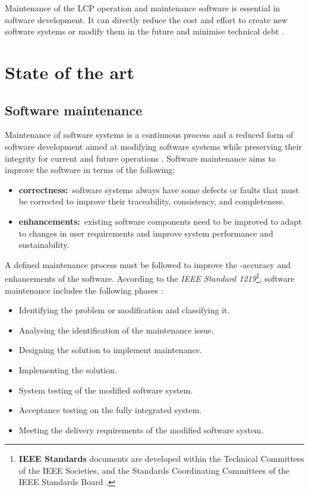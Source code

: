 Maintenance of the LCP operation and maintenance software is essential in software development. It can directly reduce the cost and effort to create new software systems or modify them in the future and minimise technical debt \cite{Thamburaj2017, DeLeon-Sigg2020}.

\section{State of the art}\label{sec:ch1_stateOfArtSection}

\subsection{Software maintenance}\label{sec:ch1_softwareMaintenanceIntro}{}
Maintenance of software systems is a continuous process and a reduced form of software development aimed at modifying software systems while preserving their integrity for current and future operations \cite{Sneed2004, Ackermann2009, Port2017}. Software maintenance aims to improve the software in terms of the following:

\begin{itemize}
	\item \textbf{correctness:}~software systems always have some defects or faults that must be corrected to improve their traceability, consistency, and completeness.
	\item \textbf{enhancements:}\RaggedRight~existing software components need to be improved to adapt to changes in user requirements and improve system performance and sustainability.
\end{itemize}

A defined maintenance process must be followed to improve the -accuracy and enhancements of the software. According to the \textit{IEEE Standard 1219}\footnote{\textbf{IEEE Standards} documents are developed within the Technical Committees of the IEEE Societies, and the Standards Coordinating Committees of the IEEE Standards Board \cite{Mamone1994}.}, software maintenance includes the following phases \cite{Mamone1994, Hasan2012, Stojanov2017}:

\begin{itemize}
	\item Identifying the problem or modification and classifying it.
	\item Analysing the identification of the maintenance issue.
	\item Designing the solution to implement maintenance.
	\item Implementing the solution.
	\item System testing of the modified software system.
	\item Acceptance testing on the fully integrated system.
	\item Meeting the delivery requirements of the modified software system.
\end{itemize}

